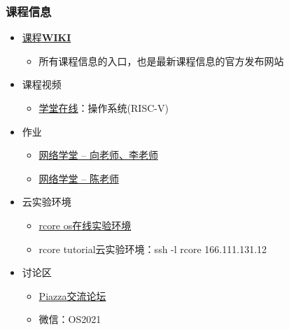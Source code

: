 \begin{frame}
    \frametitle{课程信息}
    \begin{itemize}
        \item \href{http://os.cs.tsinghua.edu.cn/oscourse/OS2021spring}{课程\textbf{WIKI}}
        \begin{itemize}
            \item 所有课程信息的入口，也是最新课程信息的官方发布网站
        \end{itemize}
        \item 课程视频
        \begin{itemize}
            \item \href{https://next.xuetangx.com/}{学堂在线}：操作系统(RISC-V)
        \end{itemize}
        \item 作业
        \begin{itemize}
            \item \href{http://learn.tsinghua.edu.cn/f/wlxt/index/course/teacher/course?wlkcid=2019-2020-2140259621}{网络学堂 -- 向老师、李老师}		
            \item \href{http://learn.tsinghua.edu.cn/f/wlxt/index/course/teacher/course?wlkcid=2019-2020-2140259622}{网络学堂 -- 陈老师}
        \end{itemize}
        \item 云实验环境
        \begin{itemize}
            \item \href{https://www.shiyanlou.com/courses/1481}{rcore os在线实验环境}
            \item rcore tutorial云实验环境：ssh -l rcore 166.111.131.12
        \end{itemize}
        \item 讨论区
        \begin{itemize}
            \item \href{https://piazza.com/tsinghua.edu.cn/spring2015/30240243x/home}{Piazza交流论坛}
            \item 微信：OS2021
        \end{itemize}
    \end{itemize}
\end{frame}
